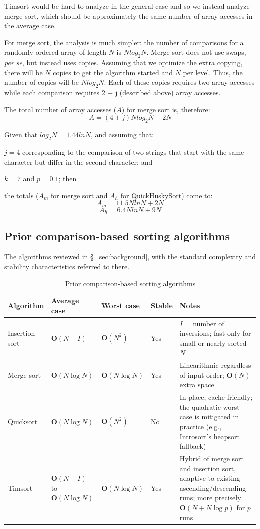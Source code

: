 \documentclass[twoside,leqno,twocolumn]{article}
\begin{document}
Timsort would be hard to analyze in the general case and so we instead analyze merge sort,
which should be approximately the same number of array accesses in the average case.
 
For merge sort, the analysis is much simpler:
the number of comparisons for a randomly ordered array of length $N$ is $N log_2 N$.
Merge sort does not use swaps, \emph{per se}, but instead uses copies.
Assuming that we optimize the extra copying, there will be $N$ copies to get the algorithm started and $N$ per level.
Thus, the number of copies will be $N {log_2 N}$.
Each of these copies requires two array accesses while each comparison requires 2 + j (described above) array accesses.
 
The total number of array accesses ($A$) for merge sort is, therefore:
\[A = (4 + j) N log_2 N + 2 N\]
 
Given that $log_2 N = 1.44 ln N$, and assuming that:

$j = 4$ corresponding to the comparison of two strings that start with the same character but differ in the second character; and

$k = 7$ and $p = 0.1$; then

the totals ($A_m$ for merge sort and $A_h$ for QuickHuskySort) come to:
 \[A_m = 11.5 N ln N + 2 N\]
 \[A_h = 6.4 N ln N + 9 N\]

\subsection{Prior comparison-based sorting algorithms}
\label{sec:prior-algorithms}

The algorithms reviewed in \S~\ref{sec:background}, with the standard complexity and stability
characteristics referred to there.

\begin{table}
  \caption{Prior comparison-based sorting algorithms}
  \label{tab:PriorAlgorithms}
  \begin{tabularx}{\textwidth}{llllX}
    \toprule
    Algorithm & Average case & Worst case & Stable & Notes \\
    \midrule
    Insertion sort & $\textbf{O}(N + I)$ & $\textbf{O}(N^2)$ & Yes & $I$ = number of inversions; fast only for small or nearly-sorted $N$ \\
    Merge sort & $\textbf{O}(N \log N)$ & $\textbf{O}(N \log N)$ & Yes & Linearithmic regardless of input order; $\textbf{O}(N)$ extra space \\
    Quicksort & $\textbf{O}(N \log N)$ & $\textbf{O}(N^2)$ & No & In-place, cache-friendly; the quadratic worst case is mitigated in practice (e.g., Introsort's heapsort fallback\cite{doi:10.1002}) \\
    Timsort & $\textbf{O}(N + I)$ to $\textbf{O}(N \log N)$ & $\textbf{O}(N \log N)$ & Yes & Hybrid of merge sort and insertion sort, adaptive to existing ascending/descending runs; more precisely $\textbf{O}(N + N \log p)$ for $p$ runs\cite{DBLP:journals/corr/abs-1805-08612} \\
    \bottomrule
  \end{tabularx}
\end{table}
\end{document}
